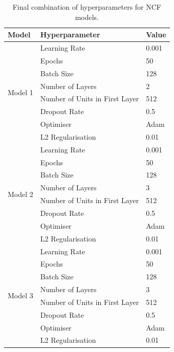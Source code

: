    \begin{table}[h]
        \centering
        \begin{tabular}{|p{3cm}|p{6cm}|p{3cm}|}
        \hline
        \textbf{Model} & \textbf{Hyperparameter} & \textbf{Value}  \\
        \hline
        \multirow{8}{*}{Model 1} & Learning Rate & 0.001 \\
        & Epochs & 50 \\
        & Batch Size & 128 \\
        & Number of Layers & 2 \\
        & Number of Units in First Layer & 512\\
        & Dropout Rate & 0.5 \\
        & Optimiser & Adam \\
        & L2 Regularisation & 0.01 \\
        \hline
        \multirow{8}{*}{Model 2} & Learning Rate & 0.001 \\
        & Epochs & 50 \\
        & Batch Size & 128 \\
        & Number of Layers & 3 \\
        & Number of Units in First Layer & 512 \\
        & Dropout Rate & 0.5 \\
        & Optimiser & Adam \\
        & L2 Regularisation & 0.01 \\
        \hline
        \multirow{8}{*}{Model 3} & Learning Rate & 0.001 \\
        & Epochs & 50 \\
        & Batch Size & 128 \\
        & Number of Layers & 3 \\
        & Number of Units in First Layer & 512 \\
        & Dropout Rate & 0.5 \\
        & Optimiser & Adam \\
        & L2 Regularisation & 0.01 \\
        \hline
        \end{tabular}
        \caption{Final combination of hyperparameters for NCF models.}
        \label{tab:hyper_final}
    \end{table}


